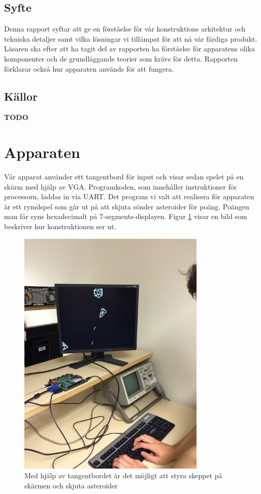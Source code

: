 \documentclass[a4paper]{article}
\begin{document}
    \subsection{Syfte}
    Denna rapport syftar att ge en förståelse för vår konstruktions arkitektur
    och tekniska detaljer samt vilka lösningar vi tillämpat för att nå vår
    färdiga produkt. Läsaren ska efter att ha tagit del av rapporten ha
    förståelse för apparatens olika komponenter och de grundläggande teorier som
    krävs för detta. Rapporten förklarar också hur apparaten används för att
    fungera.


    \subsection{Källor}
    \textbf{TODO}

    
    \newpage
        
    \section{Apparaten}
    Vår apparat använder ett tangentbord för input och visar sedan spelet på en
    skärm med hjälp av VGA. Programkoden, som innehåller instruktioner för
    processorn, laddas in via UART. Det program vi valt att realisera för apparaten
    är ett rymdspel som går ut på att skjuta sönder asteroider för poäng. Poängen
    man får syns hexadecimalt på 7-segments-displayen. Figur \ref{demo_img} visar en bild som
    beskriver hur konstruktionen ser ut.

    \begin{figure}[H]
        \centering
        \includegraphics[width=0.8\textwidth]{demo_img}
        \caption{Med hjälp av tangentbordet är det möjligt att styra skeppet på
        skärmen och skjuta asteroider\label{demo_img}}
    \end{figure}
	
\end{document}
